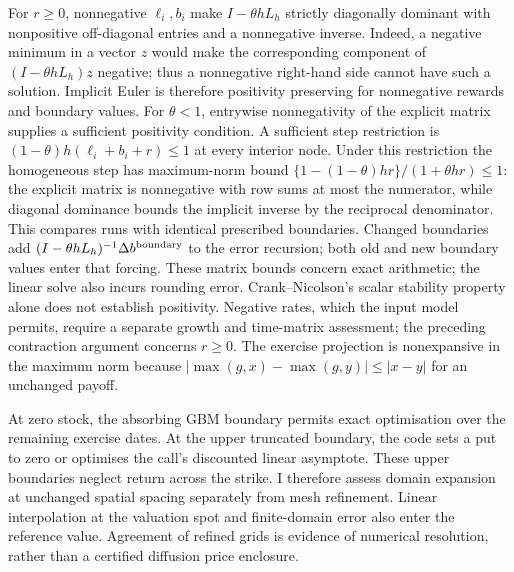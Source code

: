\documentclass[11pt]{article}
\begin{document}
For $r\geq0$, nonnegative $\ell_i,b_i$ make $I-\theta hL_h$ strictly diagonally dominant with nonpositive off-diagonal entries and a nonnegative inverse. Indeed, a negative minimum in a vector $z$ would make the corresponding component of $(I-\theta hL_h)z$ negative; thus a nonnegative right-hand side cannot have such a solution. Implicit Euler is therefore positivity preserving for nonnegative rewards and boundary values. For $\theta<1$, entrywise nonnegativity of the explicit matrix supplies a sufficient positivity condition. A sufficient step restriction is $(1-\theta)h(\ell_i+b_i+r)\leq1$ at every interior node. Under this restriction the homogeneous step has maximum-norm bound $\{1-(1-\theta)hr\}/(1+\theta hr)\leq1$: the explicit matrix is nonnegative with row sums at most the numerator, while diagonal dominance bounds the implicit inverse by the reciprocal denominator. This compares runs with identical prescribed boundaries. Changed boundaries add $(I-\theta hL_h)^{-1}\Delta b^{\rm boundary}$ to the error recursion; both old and new boundary values enter that forcing. These matrix bounds concern exact arithmetic; the linear solve also incurs rounding error. Crank--Nicolson's scalar stability property alone does not establish positivity. Negative rates, which the input model permits, require a separate growth and time-matrix assessment; the preceding contraction argument concerns $r\geq0$. The exercise projection is nonexpansive in the maximum norm because $|\max(g,x)-\max(g,y)|\leq|x-y|$ for an unchanged payoff.

At zero stock, the absorbing GBM boundary permits exact optimisation over the remaining exercise dates. At the upper truncated boundary, the code sets a put to zero or optimises the call's discounted linear asymptote. These upper boundaries neglect return across the strike. I therefore assess domain expansion at unchanged spatial spacing separately from mesh refinement. Linear interpolation at the valuation spot and finite-domain error also enter the reference value. Agreement of refined grids is evidence of numerical resolution, rather than a certified diffusion price enclosure.
\end{document}
